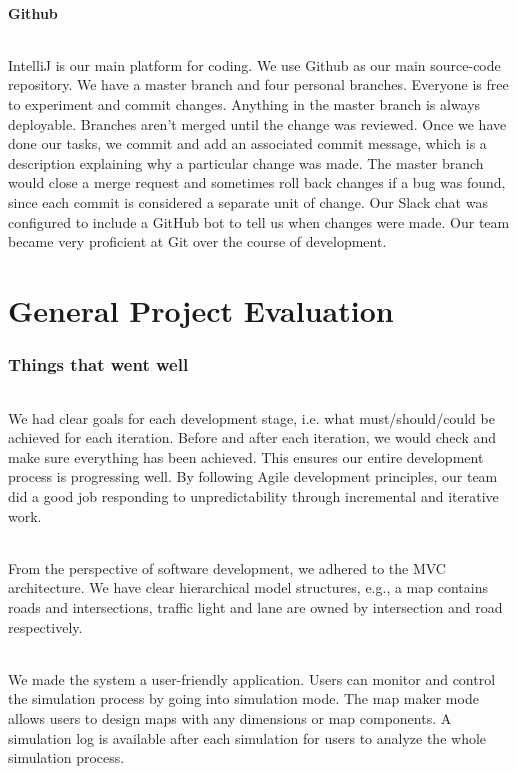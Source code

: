 \documentclass[a4paper,11pt,titlepage]{article}
\begin{document}
\subsection{Github}
\paragraph{}
IntelliJ is our main platform for coding. We use Github as our main source-code repository. We have a master branch and four personal branches. Everyone is free to experiment and commit changes. Anything in the master branch is always deployable. Branches aren't merged until the change was reviewed. Once we have done our tasks, we commit and add an associated commit message, which is a description explaining why a particular change was made. The master branch would close a merge request and sometimes roll back changes if a bug was found, since each commit is considered a separate unit of change. Our Slack chat was configured to include a GitHub bot to tell us when changes were made. Our team became very proficient at Git over the course of development.

\part{General Project Evaluation}
\section{Things that went well}
\paragraph{}
We had clear goals for each development stage, i.e. what must/should/could be achieved for each iteration. Before and after each iteration, we would check and make sure everything has been achieved. This ensures our entire development process is progressing well. By following Agile development principles, our team did a good job responding to unpredictability through incremental and iterative work. 
\paragraph{}
From the perspective of software development, we adhered to the MVC architecture. We have clear hierarchical model structures, e.g., a map contains roads and intersections, traffic light and lane are owned by intersection and road respectively.
\paragraph{}
We made the system a user-friendly application. Users can monitor and control the simulation process by going into simulation mode. The map maker mode allows users to design maps with any dimensions or map components. A simulation log is available after each simulation for users to analyze the whole simulation process. 
\end{document}
